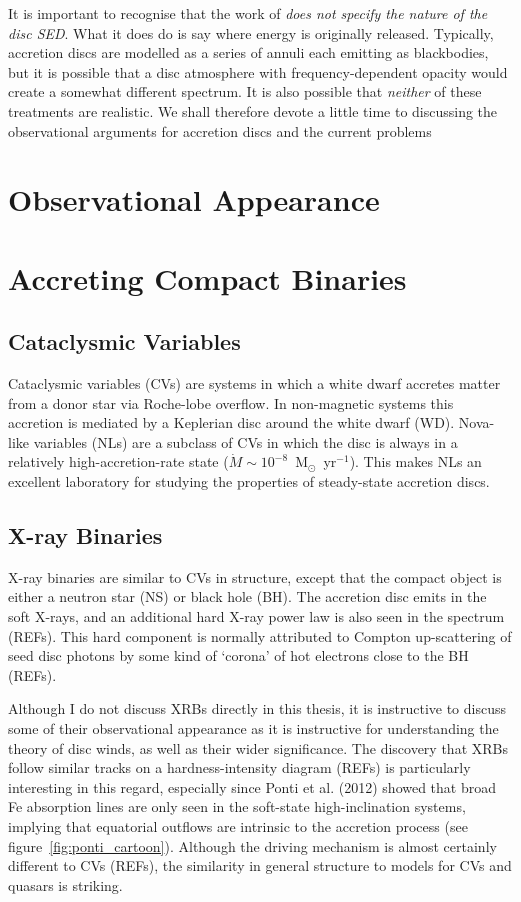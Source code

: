 It is important to recognise that the work of \cite{shakurasunyaev1973} 
{\sl does not specify the nature of the disc SED}. What it does do is 
say where energy is originally released. Typically,
accretion discs are modelled as a series of annuli each emitting 
as blackbodies, but it is possible that a disc atmosphere with frequency-dependent
opacity would create a somewhat different spectrum. It is also possible that {\em neither} of these 
treatments are realistic. We shall therefore devote a little time to discussing
the observational arguments for accretion discs and the current problems 


\section{Observational Appearance}


\section{Accreting Compact Binaries}

\subsection{Cataclysmic Variables}

Cataclysmic variables (CVs) are systems in which a white dwarf
accretes matter from a donor star via Roche-lobe overflow. 
In non-magnetic systems this accretion is mediated by a Keplerian disc
around the white dwarf (WD). Nova-like variables (NLs) are a subclass
of CVs in which the  disc is always in a relatively
high-accretion-rate state ($\dot{M} \sim 10^{-8}$~M$_{\odot}$~yr$^{-1}$).  
This makes NLs an excellent laboratory for studying the properties of 
steady-state accretion discs. 

\subsection{X-ray Binaries}
X-ray binaries are similar to CVs in structure, except that the compact object
is either a neutron star (NS) or black hole (BH). The accretion disc 
emits in the soft X-rays, and an additional hard X-ray power law is also 
seen in the spectrum (REFs). This hard component is normally attributed
to Compton up-scattering of seed disc photons by some kind of `corona'
of hot electrons close to the BH (REFs). 

Although I do not discuss XRBs directly in this thesis, it is instructive
to discuss some of their observational appearance as it is instructive 
for understanding the theory of disc winds, as well as their wider significance. 
The discovery that XRBs follow similar tracks on a hardness-intensity diagram (REFs)
is particularly interesting in this regard, especially since Ponti et al. (2012)
showed that broad Fe absorption lines are only seen in the soft-state 
high-inclination systems, implying that equatorial outflows are intrinsic to 
the accretion process (see figure~\ref{fig:ponti_cartoon}). Although the driving mechanism
is almost certainly different to CVs (REFs), the similarity in general structure 
to models for CVs and quasars is striking.

